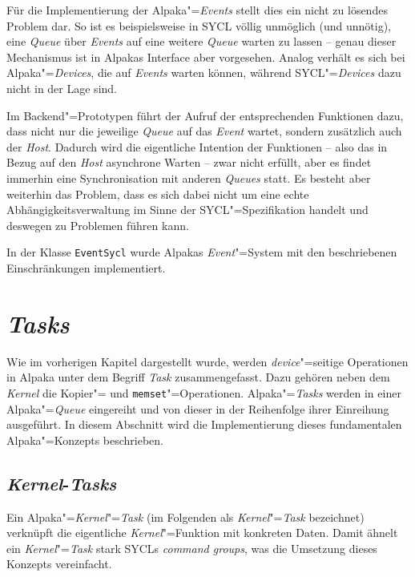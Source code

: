 Für die Implementierung der Alpaka"=\textit{Events} stellt dies ein nicht zu
lösendes Problem dar. So ist es beispielsweise in SYCL völlig unmöglich (und
unnötig), eine \textit{Queue} über \textit{Events} auf eine weitere
\textit{Queue} warten zu lassen -- genau dieser Mechanismus ist in Alpakas
Interface aber vorgesehen. Analog verhält es sich bei Alpaka"=\textit{Devices},
die auf \textit{Events} warten können, während SYCL"=\textit{Devices} dazu nicht
in der Lage sind.

Im Backend"=Prototypen führt der Aufruf der entsprechenden Funktionen dazu, dass
nicht nur die jeweilige \textit{Queue} auf das \textit{Event} wartet, sondern
zusätzlich auch der \textit{Host}. Dadurch wird die eigentliche Intention der
Funktionen -- also das in Bezug auf den \textit{Host} asynchrone Warten -- zwar
nicht erfüllt, aber es findet immerhin eine Synchronisation mit anderen
\textit{Queues} statt. Es besteht aber weiterhin das Problem, dass es sich dabei
nicht um eine echte Abhängigkeitsverwaltung im Sinne der SYCL"=Spezifikation
handelt und deswegen zu Problemen führen kann.

In der Klasse \texttt{EventSycl} wurde Alpakas \textit{Event}"=System mit den
beschriebenen Einschränkungen implementiert.

\section{\textit{Tasks}}
\label{implementierung:task}

Wie im vorherigen Kapitel dargestellt wurde, werden \textit{device}"=seitige
Operationen in Alpaka unter dem Begriff \textit{Task} zusammengefasst. Dazu
gehören neben dem \textit{Kernel} die Kopier"= und \texttt{memset}"=Operationen.
Alpaka"=\textit{Tasks} werden in einer Alpaka"=\textit{Queue} eingereiht und von
dieser in der Reihenfolge ihrer Einreihung ausgeführt. In diesem Abschnitt wird
die Implementierung dieses fundamentalen Alpaka"=Konzepts beschrieben.

\subsection{\textit{Kernel}-\textit{Tasks}}
\label{implementierung:task:kernel}

Ein Alpaka"=\textit{Kernel}"=\textit{Task} (im Folgenden als
\textit{Kernel}"=\textit{Task} bezeichnet) verknüpft die eigentliche
\textit{Kernel}"=Funktion mit konkreten Daten. Damit ähnelt ein
\textit{Kernel}"=\textit{Task} stark SYCLs \textit{command groups}, was die
Umsetzung dieses Konzepts vereinfacht.

